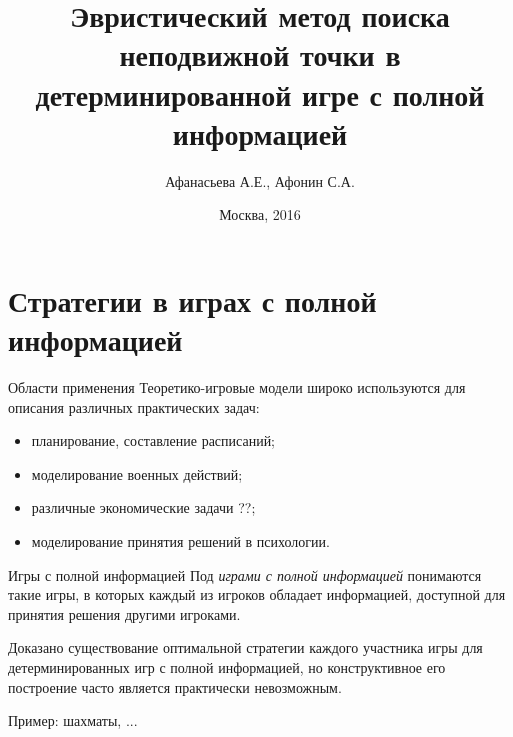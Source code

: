 \documentclass{beamer}
\begin{document}
\title{Эвристический метод поиска неподвижной точки в детерминированной игре с полной информацией} 
\author{Афанасьева А.Е., Афонин С.А.}
\date{Москва, 2016} 
\frame{\titlepage} 


%
\newcommand{\showDiagram}[2]{%
      \chessboard[%
      setpieces={#1},%
      arrow=stealth,%
      linewidth=.25ex,%
      padding=1ex,%
      color=red!55!white,%
      pgfstyle=straightmove,%
      shortenstart=1ex,%
      showmover=false,%
      markmoves={#2},%
      padding=10ex,%
      shortenend=1ex%
      ]%
}


\section{Стратегии в играх с полной информацией}
\begin{frame}{Области применения}
Теоретико-игровые модели широко используются для описания различных
практических задач: %
\begin{itemize}
\item планирование, составление расписаний;
\item моделирование военных действий;
\item различные экономические задачи  ??;
\item моделирование принятия решений в психологии.
\end{itemize}
\end{frame}

\begin{frame}{Игры с полной информацией}
Под \emph{играми с полной информацией} понимаются такие игры, в которых каждый из игроков обладает информацией, доступной для принятия решения другими игроками.
 
\bigskip
Доказано существование оптимальной стратегии каждого участника игры для детерминированных игр с полной информацией, но конструктивное его построение 
часто является практически невозможным. 

\bigskip
Пример: шахматы, ...
\end{frame}
\end{document}

